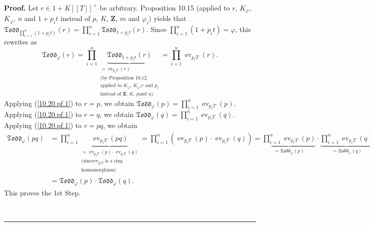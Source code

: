 \documentclass[numbers=enddot,12pt,final,onecolumn,notitlepage]{scrartcl}%
\newenvironment{proof}[1][Proof]{\noindent\textbf{#1.} }{\ \rule{0.5em}{0.5em}}
\begin{document}
\begin{proof}
Let $r\in1+K\left[  \left[  T\right]  \right]  ^{+}$ be arbitrary. Proposition
10.15 (applied to $r$, $K_{\varphi}$, $K_{\varphi}$, $n$ and $1+p_{i}t$
instead of $p$, $K$, $\mathbf{Z}$, $m$ and $\varphi_{i}$) yields that
$\mathfrak{Todd}_{\prod\limits_{i=1}^{n}\left(  1+p_{i}t\right)  }\left(
r\right)  =\prod\limits_{i=1}^{n}\mathfrak{Todd}_{1+p_{i}t}\left(  r\right)
$. Since $\prod\limits_{i=1}^{n}\left(  1+p_{i}t\right)  =\varphi$, this
rewrites as%
\begin{equation}
\mathfrak{Todd}_{\varphi}\left(  r\right)  =\prod\limits_{i=1}^{n}%
\underbrace{\mathfrak{Todd}_{1+p_{i}t}\left(  r\right)  }%
_{\substack{=\operatorname*{ev}\nolimits_{p_{i}T}\left(  r\right)  \\\text{(by
Proposition 10.12,}\\\text{applied to }K_{\varphi}\text{, }K_{\varphi}\text{,
}r\text{ and }p_{i}\\\text{instead of }\mathbf{Z}\text{, }K\text{, }p\text{
and }u\text{)}}}=\prod\limits_{i=1}^{n}\operatorname*{ev}\nolimits_{p_{i}%
T}\left(  r\right)  . \label{10.20.pf.1}%
\end{equation}
Applying (\ref{10.20.pf.1}) to $r=p$, we obtain $\mathfrak{Todd}_{\varphi
}\left(  p\right)  =\prod\limits_{i=1}^{n}\operatorname*{ev}\nolimits_{p_{i}%
T}\left(  p\right)  $. Applying (\ref{10.20.pf.1}) to $r=q$, we obtain
$\mathfrak{Todd}_{\varphi}\left(  q\right)  =\prod\limits_{i=1}^{n}%
\operatorname*{ev}\nolimits_{p_{i}T}\left(  q\right)  $. Applying
(\ref{10.20.pf.1}) to $r=pq$, we obtain
\begin{align*}
\mathfrak{Todd}_{\varphi}\left(  pq\right)   &  =\prod\limits_{i=1}%
^{n}\underbrace{\operatorname*{ev}\nolimits_{p_{i}T}\left(  pq\right)
}_{\substack{=\operatorname*{ev}\nolimits_{p_{i}T}\left(  p\right)
\cdot\operatorname*{ev}\nolimits_{p_{i}T}\left(  q\right)  \\\text{(since
}\operatorname*{ev}\nolimits_{p_{i}T}\text{ is a ring}\\\text{homomorphism)}%
}}=\prod\limits_{i=1}^{n}\left(  \operatorname*{ev}\nolimits_{p_{i}T}\left(
p\right)  \cdot\operatorname*{ev}\nolimits_{p_{i}T}\left(  q\right)  \right)
=\underbrace{\prod\limits_{i=1}^{n}\operatorname*{ev}\nolimits_{p_{i}T}\left(
p\right)  }_{=\mathfrak{Todd}_{\varphi}\left(  p\right)  }\cdot
\underbrace{\prod\limits_{i=1}^{n}\operatorname*{ev}\nolimits_{p_{i}T}\left(
q\right)  }_{=\mathfrak{Todd}_{\varphi}\left(  q\right)  }\\
&  =\mathfrak{Todd}_{\varphi}\left(  p\right)  \cdot\mathfrak{Todd}_{\varphi
}\left(  q\right)  .
\end{align*}
This proves the 1st Step.


\end{proof}
\end{document}
